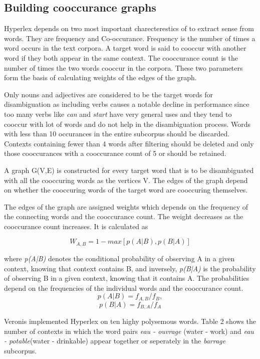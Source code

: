 \documentclass[article,dr=phil,type=drfinal,colorback,accentcolor=tud9c]{tudthesis}
\begin{document}
\subsection{Building cooccurance graphs}

Hyperlex depends on two most important charecterestics of to extract sense from words. They are frequency and Co-occurance. Frequency is the number of times a word occurs in the text corpora. A target word is said to cooccur with another word if they both appear in the same context. The cooccurance count is the number of times the two words cooccur in the corpora. These two parameters form the basis of calculating weights of the edges of the graph. 

Only nouns and adjectives are considered to be the target words for disambiguation as including verbs causes a notable decline in performance since too many verbs like \textit{can} and \textit{start} have very general uses and they tend to cooccur with lot of words and do not help in the disambiguation process. Words with less than 10 occurances in the entire subcorpus should be discarded. Contexts containing fewer than 4 words after filtering should be deleted and only those cooccurances with a cooccurance count of 5 or should be retained.

A graph G(V,E) is constructed for every target word that is to be disambiguated with all the cooccuring words as the vertices V. The edges of the graph depend on whether the cooccuring words of the target word are cooccuring themselves. 

The edges of the graph are assigned weights which depends on the frequency of the connecting words and the cooccurance count. The weight decreases as the cooccurance count increases. It is calculated as

\textit{\[W_{A,B} =  1 - max[p(A|B),p(B|A)]\]}

where \textit{p(A|B)} denotes the conditional probability of observing A in a given context, knowing that context contains B, and inversely, \textit{p(B|A)} is the probability of observing B in a given context, knowing that it contains A. The probabilities depend on the frequencies of the individual words and the cooccurance count.
\textit{\[p(A|B) = f_{A,B}/f_B,\]}
\textit{\[p(B|A) = f_{B,A}/f_A\]}

Veronis implemented Hyperlex on ten highy polysemous words. Table 2 shows the number of contexts in which the word pairs \textit{eau - ouvrage} (water - work) and \textit{eau - potable}(water - drinkable) appear together or seperately in the \textit{barrage} subcorpus.\newline
\end{document}
